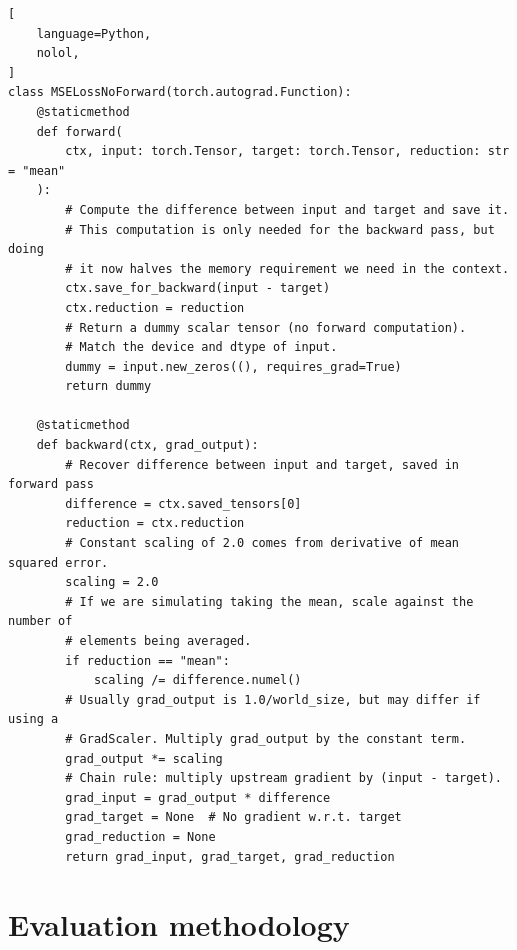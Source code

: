 \newsavebox{\mselosslistingbox}
\begin{lrbox}{\mselosslistingbox}
\begin{minipage}{\iftoggle{arxiv}{}{\dimexpr1.25}\textwidth}
\begin{lstlisting}[
    language=Python,
    nolol,
]
class MSELossNoForward(torch.autograd.Function):
    @staticmethod
    def forward(
        ctx, input: torch.Tensor, target: torch.Tensor, reduction: str = "mean"
    ):
        # Compute the difference between input and target and save it.
        # This computation is only needed for the backward pass, but doing
        # it now halves the memory requirement we need in the context.
        ctx.save_for_backward(input - target)
        ctx.reduction = reduction
        # Return a dummy scalar tensor (no forward computation).
        # Match the device and dtype of input.
        dummy = input.new_zeros((), requires_grad=True)
        return dummy

    @staticmethod
    def backward(ctx, grad_output):
        # Recover difference between input and target, saved in forward pass
        difference = ctx.saved_tensors[0]
        reduction = ctx.reduction
        # Constant scaling of 2.0 comes from derivative of mean squared error.
        scaling = 2.0
        # If we are simulating taking the mean, scale against the number of
        # elements being averaged.
        if reduction == "mean":
            scaling /= difference.numel()
        # Usually grad_output is 1.0/world_size, but may differ if using a
        # GradScaler. Multiply grad_output by the constant term.
        grad_output *= scaling
        # Chain rule: multiply upstream gradient by (input - target).
        grad_input = grad_output * difference
        grad_target = None  # No gradient w.r.t. target
        grad_reduction = None
        return grad_input, grad_target, grad_reduction
\end{lstlisting}%
\end{minipage}
\end{lrbox}
\begin{figure}
\resizebox{\textwidth}{!}{\usebox{\mselosslistingbox}}
\label{alg:mse_loss_no_forward}
\end{figure}\addtocounter{figure}{-1}


\FloatBarrier
\section{Evaluation methodology}
\label{a:eval-method}

